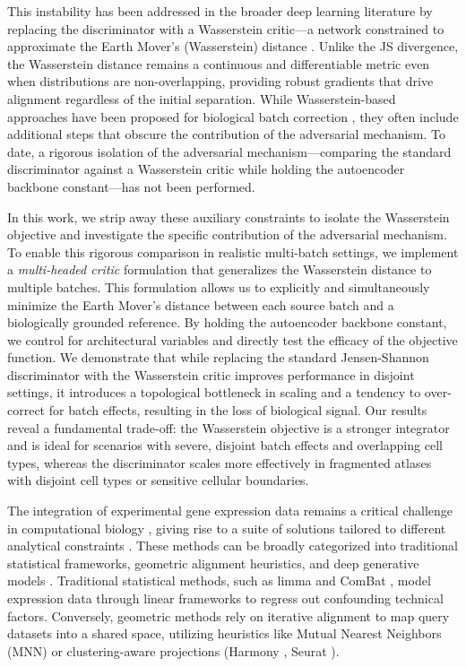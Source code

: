 \documentclass[unnumsec,webpdf,contemporary,large]{oup-authoring-template}%
\theoremstyle{thmstyleone}%
\theoremstyle{thmstyletwo}%
\theoremstyle{thmstylethree}%
\begin{document}
This instability has been addressed in the broader deep learning literature by replacing the discriminator with a Wasserstein critic---a network constrained to approximate the Earth Mover's (Wasserstein) distance \citep{10.5555/3305381.3305404}. Unlike the JS divergence, the Wasserstein distance remains a continuous and differentiable metric even when distributions are non-overlapping, providing robust gradients that drive alignment regardless of the initial separation. While Wasserstein-based approaches have been proposed for biological batch correction \citep{10.1093/bioinformatics/btac427, ijms24065502}, they often include additional steps that obscure the contribution of the adversarial mechanism. To date, a rigorous isolation of the adversarial mechanism---comparing the standard discriminator against a Wasserstein critic while holding the autoencoder backbone constant---has not been performed.

In this work, we strip away these auxiliary constraints to isolate the Wasserstein objective and investigate the specific contribution of the adversarial mechanism. To enable this rigorous comparison in realistic multi-batch settings, we implement a \textit{multi-headed critic} formulation that generalizes the Wasserstein distance to multiple batches. This formulation allows us to explicitly and simultaneously minimize the Earth Mover's distance between each source batch and a biologically grounded reference. By holding the autoencoder backbone constant, we control for architectural variables and directly test the efficacy of the objective function. We demonstrate that while replacing the standard Jensen-Shannon discriminator with the Wasserstein critic improves performance in disjoint settings, it introduces a topological bottleneck in scaling and a tendency to over-correct for batch effects, resulting in the loss of biological signal. Our results reveal a fundamental trade-off: the Wasserstein objective is a stronger integrator and is ideal for scenarios with severe, disjoint batch effects and overlapping cell types, whereas the discriminator scales more effectively in fragmented atlases with disjoint cell types or sensitive cellular boundaries.

The integration of experimental gene expression data remains a critical challenge in computational biology \citep{Luecken2025-sd}, giving rise to a suite of solutions tailored to different analytical constraints \citep{Tran2020-ar}. These methods can be broadly categorized into traditional statistical frameworks, geometric alignment heuristics, and deep generative models \citep{Luecken2022-fb}. Traditional statistical methods, such as limma \citep{10.1093/nar/gkv007} and ComBat \citep{10.1093/biostatistics/kxj037}, model expression data through linear frameworks to regress out confounding technical factors. Conversely, geometric methods rely on iterative alignment to map query datasets into a shared space, utilizing heuristics like Mutual Nearest Neighbors (MNN) \citep{Haghverdi2018-xm} or clustering-aware projections (Harmony \citep{Korsunsky2019-kj}, Seurat \citep{Stuart2019-uw}).
\end{document}
